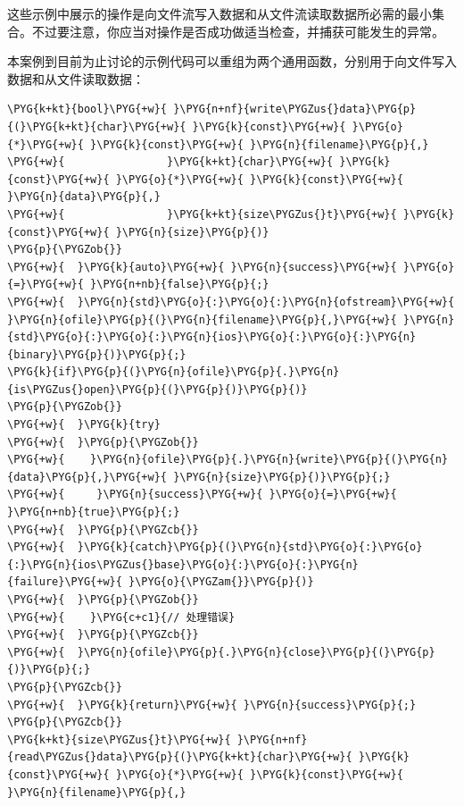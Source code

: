 
这些示例中展示的操作是向文件流写入数据和从文件流读取数据所必需的最小集合。不过要注意，你应当对操作是否成功做适当检查，并捕获可能发生的异常。



本案例到目前为止讨论的示例代码可以重组为两个通用函数，分别用于向文件写入数据和从文件读取数据：



\begin{codeblockbg}
\begin{Verbatim}[commandchars=\\\{\},breaklines=true,breakanywhere=true,fontsize=\codefont,xleftmargin=17bp]
\PYG{k+kt}{bool}\PYG{+w}{ }\PYG{n+nf}{write\PYGZus{}data}\PYG{p}{(}\PYG{k+kt}{char}\PYG{+w}{ }\PYG{k}{const}\PYG{+w}{ }\PYG{o}{*}\PYG{+w}{ }\PYG{k}{const}\PYG{+w}{ }\PYG{n}{filename}\PYG{p}{,}
\PYG{+w}{                }\PYG{k+kt}{char}\PYG{+w}{ }\PYG{k}{const}\PYG{+w}{ }\PYG{o}{*}\PYG{+w}{ }\PYG{k}{const}\PYG{+w}{ }\PYG{n}{data}\PYG{p}{,}
\PYG{+w}{                }\PYG{k+kt}{size\PYGZus{}t}\PYG{+w}{ }\PYG{k}{const}\PYG{+w}{ }\PYG{n}{size}\PYG{p}{)}
\PYG{p}{\PYGZob{}}
\PYG{+w}{  }\PYG{k}{auto}\PYG{+w}{ }\PYG{n}{success}\PYG{+w}{ }\PYG{o}{=}\PYG{+w}{ }\PYG{n+nb}{false}\PYG{p}{;}
\PYG{+w}{  }\PYG{n}{std}\PYG{o}{:}\PYG{o}{:}\PYG{n}{ofstream}\PYG{+w}{ }\PYG{n}{ofile}\PYG{p}{(}\PYG{n}{filename}\PYG{p}{,}\PYG{+w}{ }\PYG{n}{std}\PYG{o}{:}\PYG{o}{:}\PYG{n}{ios}\PYG{o}{:}\PYG{o}{:}\PYG{n}{binary}\PYG{p}{)}\PYG{p}{;}
\PYG{k}{if}\PYG{p}{(}\PYG{n}{ofile}\PYG{p}{.}\PYG{n}{is\PYGZus{}open}\PYG{p}{(}\PYG{p}{)}\PYG{p}{)}
\PYG{p}{\PYGZob{}}
\PYG{+w}{  }\PYG{k}{try}
\PYG{+w}{  }\PYG{p}{\PYGZob{}}
\PYG{+w}{    }\PYG{n}{ofile}\PYG{p}{.}\PYG{n}{write}\PYG{p}{(}\PYG{n}{data}\PYG{p}{,}\PYG{+w}{ }\PYG{n}{size}\PYG{p}{)}\PYG{p}{;}
\PYG{+w}{     }\PYG{n}{success}\PYG{+w}{ }\PYG{o}{=}\PYG{+w}{ }\PYG{n+nb}{true}\PYG{p}{;}
\PYG{+w}{  }\PYG{p}{\PYGZcb{}}
\PYG{+w}{  }\PYG{k}{catch}\PYG{p}{(}\PYG{n}{std}\PYG{o}{:}\PYG{o}{:}\PYG{n}{ios\PYGZus{}base}\PYG{o}{:}\PYG{o}{:}\PYG{n}{failure}\PYG{+w}{ }\PYG{o}{\PYGZam{}}\PYG{p}{)}
\PYG{+w}{  }\PYG{p}{\PYGZob{}}
\PYG{+w}{    }\PYG{c+c1}{// 处理错误}
\PYG{+w}{  }\PYG{p}{\PYGZcb{}}
\PYG{+w}{  }\PYG{n}{ofile}\PYG{p}{.}\PYG{n}{close}\PYG{p}{(}\PYG{p}{)}\PYG{p}{;}
\PYG{p}{\PYGZcb{}}
\PYG{+w}{  }\PYG{k}{return}\PYG{+w}{ }\PYG{n}{success}\PYG{p}{;}
\PYG{p}{\PYGZcb{}}
\PYG{k+kt}{size\PYGZus{}t}\PYG{+w}{ }\PYG{n+nf}{read\PYGZus{}data}\PYG{p}{(}\PYG{k+kt}{char}\PYG{+w}{ }\PYG{k}{const}\PYG{+w}{ }\PYG{o}{*}\PYG{+w}{ }\PYG{k}{const}\PYG{+w}{ }\PYG{n}{filename}\PYG{p}{,}

\end{Verbatim}
\end{codeblockbg}
